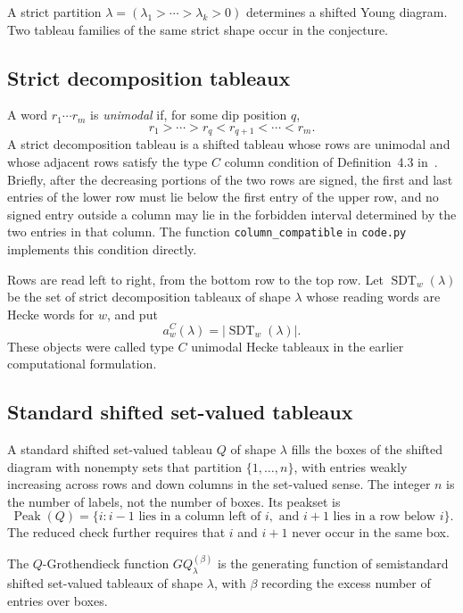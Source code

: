 \documentclass{article}
\newcommand{\Peak}{\operatorname{Peak}}
\newcommand{\SDT}{\operatorname{SDT}}
\begin{document}
A strict partition \(\lambda=(\lambda_1>\cdots>\lambda_k>0)\) determines a
shifted Young diagram.  Two tableau families of the same strict shape occur in
the conjecture.

\subsection*{Strict decomposition tableaux}

A word \(r_1\cdots r_m\) is \emph{unimodal} if, for some dip position \(q\),
\[
  r_1>\cdots>r_q<r_{q+1}<\cdots<r_m.
\]
A strict decomposition tableau is a shifted tableau whose rows are unimodal
and whose adjacent rows satisfy the type \(C\) column condition of
Definition~4.3 in~\cite{AHHP}.  Briefly, after the decreasing portions of the
two rows are signed, the first and last entries of the lower row must lie
below the first entry of the upper row, and no signed entry outside a column
may lie in the forbidden interval determined by the two entries in that
column.  The function \texttt{column\_compatible} in \texttt{code.py}
implements this condition directly.

Rows are read left to right, from the bottom row to the top row.  Let
\(\SDT_w(\lambda)\) be the set of strict decomposition tableaux of shape
\(\lambda\) whose reading words are Hecke words for \(w\), and put
\[
  a_w^C(\lambda)=|\SDT_w(\lambda)|.
\]
These objects were called type \(C\) unimodal Hecke tableaux in the earlier
computational formulation.

\subsection*{Standard shifted set-valued tableaux}

A standard shifted set-valued tableau \(Q\) of shape \(\lambda\) fills the
boxes of the shifted diagram with nonempty sets that partition
\(\{1,\ldots,n\}\), with entries weakly increasing across rows and down
columns in the set-valued sense.  The integer \(n\) is the number of labels,
not the number of boxes.  Its peakset is
\[
  \Peak(Q)=\{i: i-1\text{ lies in a column left of }i,
                 \text{ and }i+1\text{ lies in a row below }i\}.
\]
The reduced check further requires that \(i\) and \(i+1\) never occur in the
same box.

The \(Q\)-Grothendieck function \(GQ_\lambda^{(\beta)}\) is the generating
function of semistandard shifted set-valued tableaux of shape \(\lambda\),
with \(\beta\) recording the excess number of entries over boxes.
\end{document}
